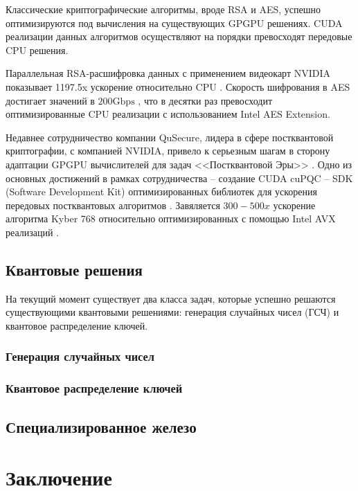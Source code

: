 \documentclass[a4paper,12pt]{article}
\begin{document}
Классические криптографические алгоритмы, вроде RSA и AES, успешно оптимизируются под вычисления на существующих GPGPU решениях. CUDA реализации данных алгоритмов осуществляют на порядки превосходят передовые CPU решения.

Параллельная RSA-расшифровка данных с применением видеокарт NVIDIA показывает 1197.5x ускорение относительно CPU \cite{RSA_CUDA}. Скорость шифрования в AES достигает значений в $200 \text{Gbps}$ \cite{AES_CUDA} \cite{AES_Pascal}, что в десятки раз превосходит оптимизированные CPU реализации с использованием Intel AES Extension. 
    
Недавнее сотрудничество компании QuSecure, лидера в сфере постквантовой криптографии, с компанией NVIDIA, привело к серьезным шагам в сторону адаптации GPGPU вычислителей для задач <<Постквантовой Эры>> \cite{cuPQC_Blog}. Одно из основных достижений в рамках сотрудничества -- создание CUDA cuPQC -- SDK (Software Development Kit) оптимизированных библиотек для ускорения передовых постквантовых алгоритмов . Завяляется $300-500x$ ускорение алгоритма Kyber 768 относительно оптимизированных с помощью Intel AVX реализаций \cite{cuPQC}.  


\subsection{Квантовые решения}

На текущий момент существует два класса задач, которые успешно решаются существующими квантовыми решениями: генерация случайных чисел (ГСЧ) и квантовое распределение ключей.

\subsubsection{Генерация случайных чисел}
\subsubsection{Квантовое распределение ключей}

\subsection{Специализированное железо}
\section{Заключение}


\newpage

\end{document}
